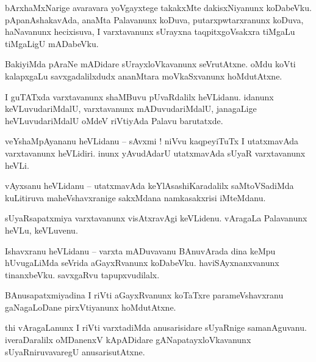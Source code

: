 \documentclass{article}
\begin{document}
\begin{mng}%
bArxhaMxNarige avaravara yoVgayxtege takakxMte dakisxNiyanunx koDabeVku. pApanAshakavAda, anaMta 
Palavanunx koDuva, putarxpwtarxranunx koDuva, haNavanunx hecixisuva, I varxtavanunx sUrayxna 
taqpitxgoVsakxra tiMgaLu tiMgaLigU mADabeVku.
\end{mng}

\begin{mng}%
BakiyiMda pAraNe mADidare sUrayxloVkavanunx seVrutAtxne. oMdu koVti kalapxgaLu savxgadalilxdudx 
ananMtara moVkaSxvanunx hoMdutAtxne.
\end{mng}

\begin{mng}%
I guTATxda varxtavanunx shaMBuvu pUvaRdalilx heVLidanu. idanunx keVLuvudariMdalU, varxtavanunx 
mADuvudariMdalU, janagaLige heVLuvudariMdalU oMdeV riVtiyAda Palavu barutatxde.
\end{mng}


\begin{mng}%
veYshaMpAyananu heVLidanu -- sAvxmi ! niVvu kaqpeyiTuTx I utatxmavAda varxtavanunx heVLidiri. 
inunx yAvudAdarU utatxmavAda sUyaR varxtavanunx heVLi.
\end{mng}

\begin{mng}%
vAyxsanu heVLidanu -- utatxmavAda keYlAsashiKaradalilx saMtoVSadiMda kuLitiruva maheVshavxranige 
sakxMdana namkasakxrisi iMteMdanu.
\end{mng}

\begin{mng}%
sUyaRsapatxmiya varxtavanunx visAtxravAgi keVLidenu. vAragaLa Palavanunx heVLu, keVLuvenu.
\end{mng}

\begin{mng}%
Ishavxranu heVLidanu -- varxta mADuvavanu BAnuvArada dina keMpu hUvugaLiMda seVrida aGayxRvanunx 
koDabeVku. haviSAyxnanxvanunx tinanxbeVku. savxgaRvu tapupxvudilalx.
\end{mng}

\begin{mng}%
BAnusapatxmiyadina I riVti aGayxRvanunx koTaTxre parameVshavxranu gaNagaLoDane pirxVtiyanunx 
hoMdutAtxne.
\end{mng}

\begin{mng}%
thi vAragaLanunx I riVti varxtadiMda anusarisidare sUyaRnige samanAguvanu. iveraDaralilx oMDanenxV 
kApADidare gANapatayxloVkavanunx sUyaRniruvavaregU anusarisutAtxne.
\end{mng}
\end{document}

